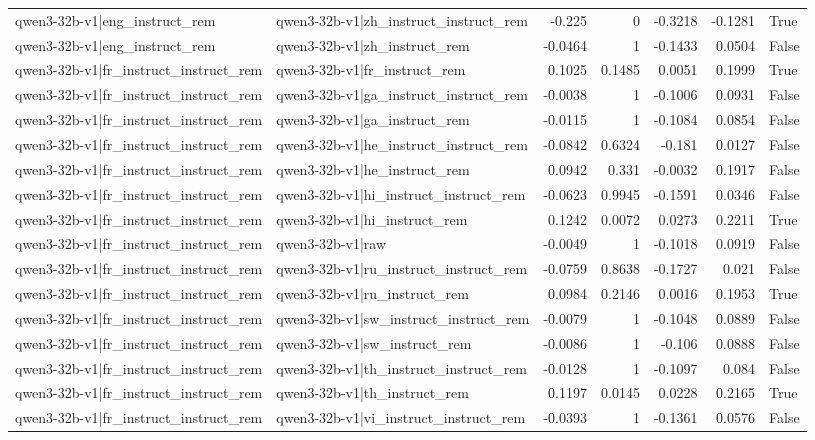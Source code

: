 \begin{table}
\begin{tabular}{l l r r r r l}
qwen3-32b-v1|eng_instruct_rem & qwen3-32b-v1|zh_instruct_instruct_rem & -0.225 & 0 & -0.3218 & -0.1281 & True \\
qwen3-32b-v1|eng_instruct_rem & qwen3-32b-v1|zh_instruct_rem & -0.0464 & 1 & -0.1433 & 0.0504 & False \\
qwen3-32b-v1|fr_instruct_instruct_rem & qwen3-32b-v1|fr_instruct_rem & 0.1025 & 0.1485 & 0.0051 & 0.1999 & True \\
qwen3-32b-v1|fr_instruct_instruct_rem & qwen3-32b-v1|ga_instruct_instruct_rem & -0.0038 & 1 & -0.1006 & 0.0931 & False \\
qwen3-32b-v1|fr_instruct_instruct_rem & qwen3-32b-v1|ga_instruct_rem & -0.0115 & 1 & -0.1084 & 0.0854 & False \\
qwen3-32b-v1|fr_instruct_instruct_rem & qwen3-32b-v1|he_instruct_instruct_rem & -0.0842 & 0.6324 & -0.181 & 0.0127 & False \\
qwen3-32b-v1|fr_instruct_instruct_rem & qwen3-32b-v1|he_instruct_rem & 0.0942 & 0.331 & -0.0032 & 0.1917 & False \\
qwen3-32b-v1|fr_instruct_instruct_rem & qwen3-32b-v1|hi_instruct_instruct_rem & -0.0623 & 0.9945 & -0.1591 & 0.0346 & False \\
qwen3-32b-v1|fr_instruct_instruct_rem & qwen3-32b-v1|hi_instruct_rem & 0.1242 & 0.0072 & 0.0273 & 0.2211 & True \\
qwen3-32b-v1|fr_instruct_instruct_rem & qwen3-32b-v1|raw & -0.0049 & 1 & -0.1018 & 0.0919 & False \\
qwen3-32b-v1|fr_instruct_instruct_rem & qwen3-32b-v1|ru_instruct_instruct_rem & -0.0759 & 0.8638 & -0.1727 & 0.021 & False \\
qwen3-32b-v1|fr_instruct_instruct_rem & qwen3-32b-v1|ru_instruct_rem & 0.0984 & 0.2146 & 0.0016 & 0.1953 & True \\
qwen3-32b-v1|fr_instruct_instruct_rem & qwen3-32b-v1|sw_instruct_instruct_rem & -0.0079 & 1 & -0.1048 & 0.0889 & False \\
qwen3-32b-v1|fr_instruct_instruct_rem & qwen3-32b-v1|sw_instruct_rem & -0.0086 & 1 & -0.106 & 0.0888 & False \\
qwen3-32b-v1|fr_instruct_instruct_rem & qwen3-32b-v1|th_instruct_instruct_rem & -0.0128 & 1 & -0.1097 & 0.084 & False \\
qwen3-32b-v1|fr_instruct_instruct_rem & qwen3-32b-v1|th_instruct_rem & 0.1197 & 0.0145 & 0.0228 & 0.2165 & True \\
qwen3-32b-v1|fr_instruct_instruct_rem & qwen3-32b-v1|vi_instruct_instruct_rem & -0.0393 & 1 & -0.1361 & 0.0576 & False \\

\end{tabular}
\end{table}
